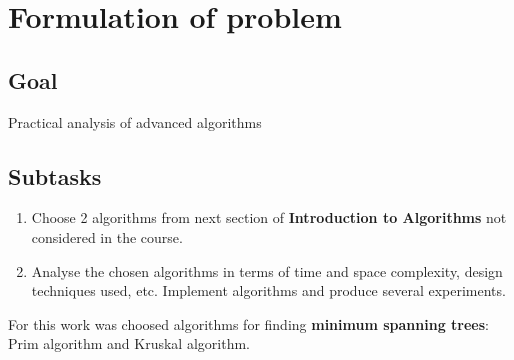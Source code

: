 \section*{Formulation of problem}

\subsection*{Goal}

Practical analysis of advanced algorithms

\subsection*{Subtasks}
\begin{enumerate}
    \item Choose 2 algorithms from next section of \textbf{Introduction to Algorithms} not considered in the course.
    \item Analyse the chosen algorithms in terms of time and space complexity, design techniques used, etc. Implement algorithms and produce several experiments.
\end{enumerate}

For this work was choosed algorithms for finding \textbf{minimum spanning trees}: Prim algorithm and Kruskal algorithm.